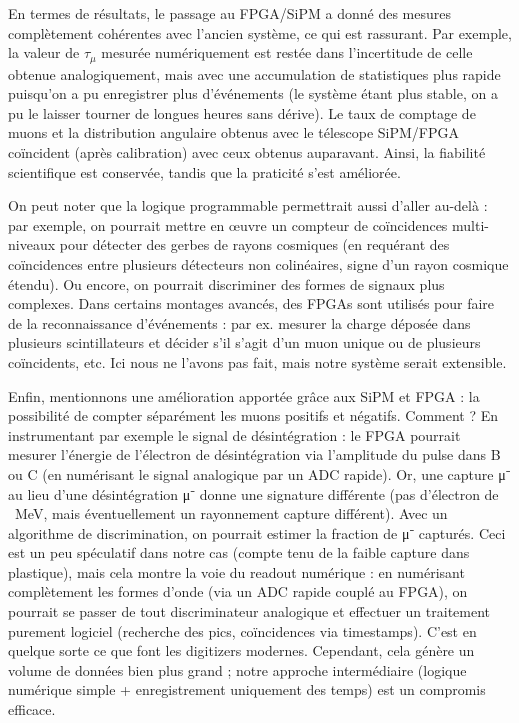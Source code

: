 \documentclass[a4paper,12pt,twoside]{article}
\begin{document}
En termes de résultats, le passage au FPGA/SiPM a donné des mesures complètement cohérentes avec l’ancien système, ce qui est rassurant. Par exemple, la valeur de $\tau_\mu$ mesurée numériquement est restée dans l’incertitude de celle obtenue analogiquement, mais avec une accumulation de statistiques plus rapide puisqu’on a pu enregistrer plus d’événements (le système étant plus stable, on a pu le laisser tourner de longues heures sans dérive). Le taux de comptage de muons et la distribution angulaire obtenus avec le télescope SiPM/FPGA coïncident (après calibration) avec ceux obtenus auparavant. Ainsi, la fiabilité scientifique est conservée, tandis que la praticité s’est améliorée.

On peut noter que la logique programmable permettrait aussi d’aller au-delà : par exemple, on pourrait mettre en œuvre un compteur de coïncidences multi-niveaux pour détecter des gerbes de rayons cosmiques (en requérant des coïncidences entre plusieurs détecteurs non colinéaires, signe d’un rayon cosmique étendu). Ou encore, on pourrait discriminer des formes de signaux plus complexes. Dans certains montages avancés, des FPGAs sont utilisés pour faire de la reconnaissance d’événements : par ex. mesurer la charge déposée dans plusieurs scintillateurs et décider s’il s’agit d’un muon unique ou de plusieurs coïncidents, etc. Ici nous ne l’avons pas fait, mais notre système serait extensible.

Enfin, mentionnons une amélioration apportée grâce aux SiPM et FPGA : la possibilité de compter séparément les muons positifs et négatifs. Comment ? En instrumentant par exemple le signal de désintégration : le FPGA pourrait mesurer l’énergie de l’électron de désintégration via l’amplitude du pulse dans B ou C (en numérisant le signal analogique par un ADC rapide). Or, une capture μ⁻ au lieu d’une désintégration μ⁻ donne une signature différente (pas d’électron de ~MeV, mais éventuellement un rayonnement capture différent). Avec un algorithme de discrimination, on pourrait estimer la fraction de μ⁻ capturés. Ceci est un peu spéculatif dans notre cas (compte tenu de la faible capture dans plastique), mais cela montre la voie du readout numérique : en numérisant complètement les formes d’onde (via un ADC rapide couplé au FPGA), on pourrait se passer de tout discriminateur analogique et effectuer un traitement purement logiciel (recherche des pics, coïncidences via timestamps). C’est en quelque sorte ce que font les digitizers modernes. Cependant, cela génère un volume de données bien plus grand ; notre approche intermédiaire (logique numérique simple + enregistrement uniquement des temps) est un compromis efficace.
\end{document}

